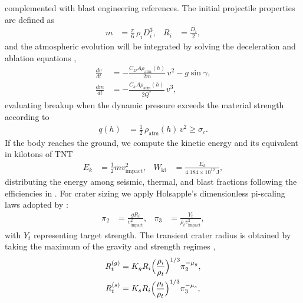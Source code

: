 \documentclass[conference]{IEEEtran}
\begin{document}
\begin{itemize}
	      complemented with blast engineering references. The initial projectile
	      properties are defined as
	      \begin{align}
		      m   & = \tfrac{\pi}{6}\,\rho_i D_i^3,          &
		      R_i & = \tfrac{D_i}{2}, \label{eq:impact-mass}
	      \end{align}
	      and the atmospheric evolution will be integrated by solving the
	      deceleration and ablation equations \cite{collins2005},
	      \begin{align}
		      \frac{dv}{dt} & = -\frac{C_D A \rho_{\text{atm}}(h)}{2 m}\,v^2 - g\sin\gamma, \label{eq:drag} \\
		      \frac{dm}{dt} & = -\frac{C_h A \rho_{\text{atm}}(h)}{2 Q^*}\,v^3, \label{eq:ablation}
	      \end{align}
	      evaluating breakup when the dynamic pressure exceeds the material
	      strength according to
	      \begin{align}
		      q(h) & = \tfrac{1}{2}\,\rho_{\text{atm}}(h)\,v^2 \ge \sigma_c. \label{eq:breakup}
	      \end{align}
	      If the body reaches the ground, we compute the kinetic energy and its
	      equivalent in kilotons of TNT
	      \begin{align}
		      E_k           & = \tfrac{1}{2} m v_{\text{impact}}^2,                           &
		      W_{\text{kt}} & = \frac{E_k}{4.184 \times 10^{12}\ \text{J}}, \label{eq:energy}
	      \end{align}
	      distributing the energy among seismic, thermal, and blast fractions
	      following the efficiencies in \cite{collins2005,glasstone1977}. For crater
	      sizing we apply Holsapple's dimensionless pi-scaling laws adopted by
	      \cite{collins2005}:
	      \begin{align}
		      \pi_2 & = \frac{g R_i}{v_{\text{impact}}^2},                           &
		      \pi_3 & = \frac{Y_t}{\rho_t v_{\text{impact}}^2}, \label{eq:pi-groups}
	      \end{align}
	      with $Y_t$ representing target strength. The transient crater radius is
	      obtained by taking the maximum of the gravity and strength regimes
	      \cite{collins2005,holsapple1993},
	      \begin{align}
		      R_t^{(g)} & = K_g R_i \Bigl(\frac{\rho_i}{\rho_t}\Bigr)^{1/3}\pi_2^{-\mu_g}, \label{eq:rt-gravity}  \\
		      R_t^{(s)} & = K_s R_i \Bigl(\frac{\rho_i}{\rho_t}\Bigr)^{1/3}\pi_3^{-\mu_s}, \label{eq:rt-strength} \\

\end{align}
\end{itemize}
\end{document}
